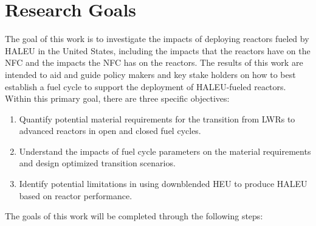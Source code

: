 \section{Research Goals}
The goal of this work is to investigate the impacts of deploying reactors 
fueled 
by \gls{HALEU} in the United States, including the impacts that the reactors 
have on the \gls{NFC} and the impacts the \gls{NFC} has on the reactors. 
The results of this work are intended to
aid and guide policy makers and key stake holders on how to best establish a 
fuel cycle to support the deployment of \gls{HALEU}-fueled reactors. 
Within this primary goal, there are three specific objectives:
\vspace{0.2cm} 
\noindent
\begin{enumerate}
\item Quantify potential material requirements for the transition 
from \glspl{LWR} to advanced reactors in open and closed 
fuel cycles.

\item Understand the impacts of fuel cycle parameters on the material 
requirements and design optimized transition scenarios.

\item Identify potential limitations in using downblended \gls{HEU} 
to produce \gls{HALEU} based on reactor performance.

\end{enumerate}
The goals of this work will be completed through the following steps:
\vspace{0.2cm} 
\noindent
